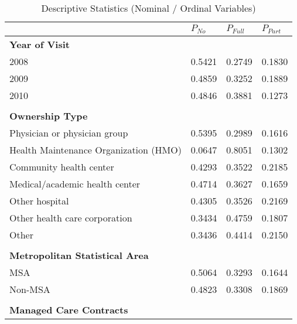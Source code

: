 \documentclass[11pt, oneside]{article}        %
\begin{document}
\begin{table}[h]
\footnotesize 
\centering
\caption{Descriptive Statistics (Nominal / Ordinal Variables)}

\label{tab:desc1}
\begin{tabular}{llll}

\hline \hline
                                       & $P_{No}$ & $P_{Full} $& $P_{Part}$ \\
                                       \hline
\textbf{Year of Visit}                 &        &          &          \\
2008                                   & 0.5421 & 0.2749   & 0.1830    \\
2009                                   & 0.4859 & 0.3252   & 0.1889   \\
2010                                   & 0.4846 & 0.3881   & 0.1273   \\
                                       &        &          &          \\
\textbf{Ownership Type}                &        &          &          \\
Physician or physician group           & 0.5395 & 0.2989   & 0.1616   \\
Health Maintenance Organization (HMO)  & 0.0647 & 0.8051   & 0.1302   \\
Community health center                & 0.4293 & 0.3522   & 0.2185   \\
Medical/academic health center         & 0.4714 & 0.3627   & 0.1659   \\
Other hospital                         & 0.4305 & 0.3526   & 0.2169   \\
Other health care corporation          & 0.3434 & 0.4759   & 0.1807   \\
Other                                  & 0.3436 & 0.4414   & 0.2150    \\
                                       &        &          &          \\
\textbf{Metropolitan Statistical Area} &        &          &          \\
MSA                                    & 0.5064 & 0.3293   & 0.1644   \\
Non-MSA                                & 0.4823 & 0.3308   & 0.1869   \\
                                       &        &          &          \\
\textbf{Managed Care Contracts}        &        &          &          \\

\end{tabular}
\end{table}
\end{document}
